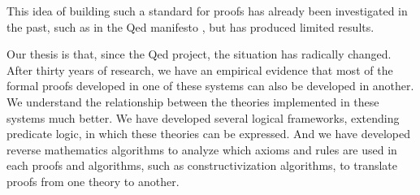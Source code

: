 This idea of building such a standard for proofs has already been
investigated in the past, such as in the Qed manifesto \cite{Qed94}, but
has produced limited results.

Our thesis is that, since the
Qed project, the situation has radically changed. After
thirty years of research, we have an empirical evidence that most of
the formal proofs developed in one of these systems can also be
developed in another. We understand the relationship between the
theories implemented in these systems much better. We have developed
several logical frameworks, extending predicate logic, in which these
theories can be expressed. And we have developed reverse mathematics
algorithms to analyze which axioms and rules are used in each proofs
and algorithms, such as constructivization algorithms, to translate
proofs from one theory to another.


